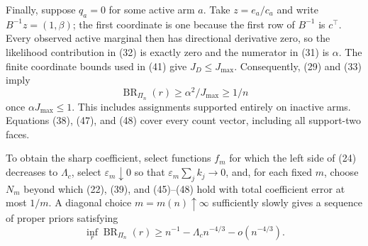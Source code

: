 Finally, suppose \(q_a=0\) for some active arm \(a\).  Take \(z=e_a/c_a\) and write \(B^{-1}z=(1,\beta)\); the first coordinate is one because the first row of \(B^{-1}\) is \(c^\top\).  Every observed active marginal then has directional derivative zero, so the likelihood contribution in (32) is exactly zero and the numerator in (31) is \(\alpha\).  The finite coordinate bounds used in (41) give \(J_D\le J_{\max}\).  Consequently, (29) and (33) imply
\[
\operatorname{BR}_{\Pi_n}(r)\ge\alpha^2/J_{\max}\ge1/n
\tag{48}
\]
once \(\alpha J_{\max}\le1\).  This includes assignments supported entirely on inactive arms.  Equations (38), (47), and (48) cover every count vector, including all support-two faces.

To obtain the sharp coefficient, select functions \(f_m\) for which the left side of (24) decreases to \(\Lambda_c\), select \(\varepsilon_m\downarrow0\) so that \(\varepsilon_m\sum_jk_j\to0\), and, for each fixed \(m\), choose \(N_m\) beyond which (22), (39), and (45)--(48) hold with total coefficient error at most \(1/m\).  A diagonal choice \(m=m(n)\uparrow\infty\) sufficiently slowly gives a sequence of proper priors satisfying
\[
\inf_r\operatorname{BR}_{\Pi_n}(r)
\ge n^{-1}-\Lambda_cn^{-4/3}-o(n^{-4/3}).
\]

